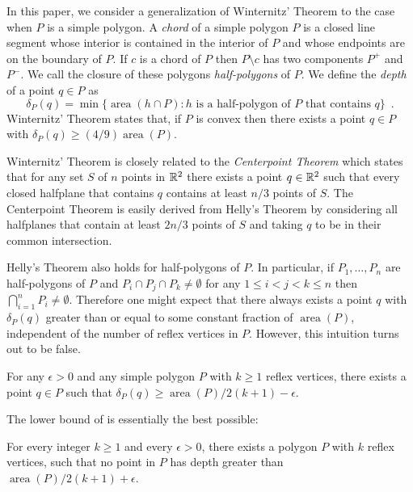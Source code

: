 \documentclass{article}
\DeclareMathOperator{\area}{area}
\begin{document}
In this paper, we consider a generalization of Winternitz' Theorem to
the case when $P$ is a simple polygon.  A \emph{chord} of a simple
polygon $P$ is a closed line segment whose interior is contained in
the interior of $P$ and whose endpoints are on the boundary of $P$.
If $c$ is a chord of $P$ then $P\setminus c$ has two components $P^+$
and $P^-$.  We call the closure of these polygons \emph{half-polygons}
of $P$.  We define the \emph{depth} of a point $q\in P$ as 
\[
     \delta_P(q) = \min\{\area(h\cap P) : \mbox{$h$ is a half-polygon
	of $P$ that contains $q$} \} \enspace .
\]
Winternitz' Theorem states that, if $P$ is convex then there exists a
point $q\in P$ with $\delta_P(q)\ge (4/9)\area(P)$.  

Winternitz' Theorem is closely related to the \emph{Centerpoint
Theorem} \cite{m02,pa95} which states that for any set $S$ of $n$
points in $\mathbb{R}^2$ there exists a point $q\in\mathbb{R}^2$ such that every
closed halfplane that contains $q$ contains at least $n/3$
points of $S$.  The Centerpoint Theorem is easily derived from Helly's
Theorem \cite{e93} by considering all halfplanes that contain at least
$2n/3$ points of $S$ and taking $q$ to be in their common
intersection.

Helly's Theorem also holds for half-polygons of $P$.  In particular,
if $P_1,\ldots,P_n$ are half-polygons of $P$ and $P_i\cap P_j\cap
P_k\neq \emptyset$ for any $1\le i < j < k\le n$ then $\bigcap_{i=1}^n
P_i\neq \emptyset$.  Therefore one might expect that there always
exists a point $q$ with $\delta_P(q)$ greater than or equal to some
constant fraction of $\area(P)$, independent of the number of reflex
vertices in $P$.  However, this intuition turns out to be false.

\begin{thm}
For any $\epsilon > 0$ and any simple polygon $P$ with $k \ge 1$
reflex vertices, there exists a point $q\in P$ such that
$\delta_P(q)\ge \area(P)/2(k+1)-\epsilon$.
\end{thm}

The lower bound of  is essentially the best
possible:

\begin{thm}
For every integer $k\ge 1$ and every $\epsilon > 0$,
there exists a polygon $P$ with $k$ reflex vertices, such that no point
in $P$ has depth greater than  $\area(P)/2(k+1) + \epsilon$.
\end{thm}
\end{document}
